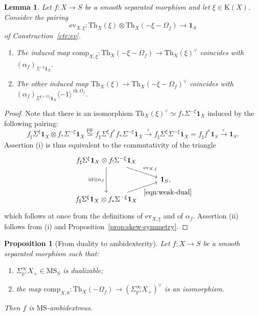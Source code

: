 \documentclass{amsart}
\numberwithin{equation}{section}
\theoremstyle{plain}
\newtheorem{proposition}[equation]{Proposition}
\newtheorem{lemma}[equation]{Lemma}
\theoremstyle{definition}
\let\bb=\mathbb
\def\P{\bb P}
\def\1{\mathbf 1}
\def\id{\mathrm{id}}
\def\Th{\mathrm{Th}}
\DeclareMathOperator{\rk}{rk}
\def\K{\mathrm{K}{}}
\def\MS{\mathrm{MS}}
\def\ev{\mathrm{ev}}
\let\epsilon=\varepsilon
\begin{document}
\begin{lemma}\label{lem:duality-pairing}
	Let $f\colon X\to S$ be a smooth separated morphism and let $\xi\in\K(X)$. Consider the pairing
	\[
	\ev_{X,\xi}\colon \Th_X(\xi) \otimes \Th_X(-\xi-\Omega_f) \to \1_S
	\]
	of Construction~\ref{ctr:ev}.
	\begin{enumerate}
		\item The induced map $\mathrm{comp}_{X,\xi}\colon \Th_X(-\xi-\Omega_f)\to\Th_X(\xi)^\vee$ coincides with $(\alpha_f)_{\Sigma^{-\xi}\1_X}$.
		\item The other induced map $\Th_X(\xi)\to \Th_X(-\xi-\Omega_f)^\vee$ coincides with $(\alpha_f)_{\Sigma^{\xi+\Omega_f}\1_X} \langle -1\rangle^{\rk\Omega_f}$.
	\end{enumerate}
\end{lemma}

\begin{proof}
	Note that there is an isomorphism $\Th_X(\xi)^\vee\simeq f_*\Sigma^{-\xi}\1_X$ induced by the following pairing:
	\begin{equation}\label{eqn:weak-dual}
	f_\sharp\Sigma^\xi\1_X \otimes f_*\Sigma^{-\xi}\1_X\overset{\mathrm{PF}}{\simeq} f_\sharp \Sigma^\xi f^*f_*\Sigma^{-\xi}\1_X \xrightarrow{\epsilon} f_\sharp\Sigma^{\xi}\Sigma^{-\xi}\1_X=f_\sharp f^*\1_S \xrightarrow{\epsilon} \1_S.
	\end{equation}
	Assertion (i) is thus equivalent to the commutativity of the triangle
	\[
	\begin{tikzcd}[row sep=1em]
		f_\sharp\Sigma^\xi\1_X \otimes f_!\Sigma^{-\xi}\1_X \ar{dr}{\ev_{X,\xi}} \ar{dd}[swap]{\id\otimes\alpha_f} & \\
		& \1_S\rlap, \\
		f_\sharp\Sigma^\xi\1_X \otimes f_*\Sigma^{-\xi}\1_X \ar{ur}[swap]{\eqref{eqn:weak-dual}} &
	\end{tikzcd}
	\]
	which follows at once from the definitions of $\ev_{X,\xi}$ and of $\alpha_f$.
	Assertion (ii) follows from (i) and Proposition~\ref{prop:skew-symmetry}.
\end{proof}

\begin{proposition}[From duality to ambidexterity]
	\label{prop:dual->ambi}
	Let $f\colon X\to S$ be a smooth separated morphism such that:
	\begin{enumerate}
		\item $\Sigma^\infty_{\P^1}X_+\in \MS_S$ is dualizable;
		\item the map $\mathrm{comp}_{X,0}\colon \Th_X(-\Omega_f)\to (\Sigma^\infty_{\P^1} X_+)^\vee$ is an isomorphism.
	\end{enumerate}
	Then $f$ is $\MS$-ambidextrous.
\end{proposition}
\end{document}
